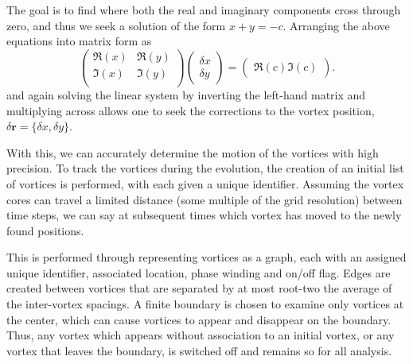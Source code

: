 The goal is to find where both the real and imaginary components cross through zero, and thus we seek a solution of the form $x + y = -c$. Arranging the above equations into matrix form as
\begin{equation}\left(
    \begin{array}{cc}
        \Re(x) & \Re(y) \\
        \Im(x) & \Im(y) \\
    \end{array}\right)
    \left(
    \begin{array}{c}
        \delta x \\
        \delta y
    \end{array}\right)
    =
    \left(
    \begin{array}{c}
        \Re(c)
        \Im(c)
    \end{array}\right).
\end{equation}
and again solving the linear system by inverting the left-hand matrix and multiplying across allows one to seek the corrections to the vortex position, $\delta \mathbf{r} = \{\delta x, \delta y \}$.


 With this, we can accurately determine the motion of the vortices with high precision. To track the vortices during the evolution, the creation of an initial list of vortices is performed, with each given a unique identifier. Assuming the vortex cores can travel a limited distance (some multiple of the grid resolution) between time steps, we can say at subsequent times which vortex has moved to the newly found positions.

 This is performed through representing vortices as a graph, each with an assigned unique identifier, associated location, phase winding and on/off flag. Edges are created between vortices that are separated by at most root-two the average of the inter-vortex spacings. A finite boundary is chosen to examine only vortices at the center, which can cause vortices to appear and disappear on the boundary. Thus, any vortex which appears without association to an initial vortex, or any vortex that leaves the boundary, is switched off and remains so for all analysis.
